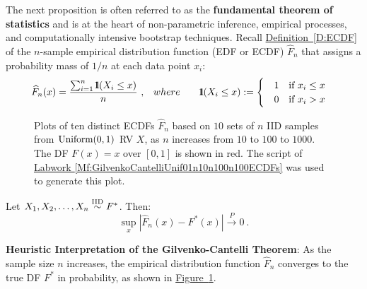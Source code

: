 The next proposition is often referred to as the {\bf fundamental theorem of statistics} and is at the heart of non-parametric inference, empirical processes, and computationally intensive bootstrap techniques.  Recall  \hyperref[D:ECDF]{Definition~\ref*{D:ECDF}} of the $n$-sample empirical distribution function (EDF or ECDF) $\widehat{F}_n$ that assigns a probability mass of $1/n$ at each data point $x_i$:
\begin{eqnarray*} %
\widehat{F}_n(x) = \frac{ \sum_{i=1}^n \BB{1}(X_i \leq x) }{n} \ ,  & \quad where \qquad
\BB{1}(X_i \leq x) :=
\begin{cases}
& 1  \quad \text{if $x_i \leq x$} \\
& 0  \quad \text{if $x_i > x$} 
\end{cases}
\end{eqnarray*}

\begin{figure}[htpb]
\caption{Plots of ten distinct ECDFs $\widehat{F}_n$ based on $10$ sets of $n$ IID samples from $\mbox{{\rm Uniform}}(0,1)$ RV $X$, as $n$ increases from $10$ to $100$ to $1000$.  The DF $F(x)=x$ over $[0,1]$ is shown in red.  The script of \hyperref[Mf:GilvenkoCantelliUnif01n10n100n100ECDFs]{Labwork \ref*{Mf:GilvenkoCantelliUnif01n10n100n100ECDFs}} was used to generate this plot.   \label{F:GilvenkoCantelliUnif01n10n100n100ECDFs}}
\centering   {}
\end{figure}
\begin{prop}\label{P:Gilvenko-Cantelli}
Let $X_1,X_2,\ldots,X_n \overset{{\rm IID}}{\sim} F^*$.  Then:
\[
\sup_x { | \widehat{F}_n(x) - F^*(x) | } \overset{P}{\longrightarrow} 0 \ .
\]
\end{prop}
{\bf Heuristic Interpretation of the Gilvenko-Cantelli Theorem}:  As the sample size $n$ increases, the empirical distribution function $\widehat{F}_n$ converges to the true DF $F^*$ in probability, as shown in \hyperref[F:GilvenkoCantelliUnif01n10n100n100ECDFs]{Figure~\ref*{F:GilvenkoCantelliUnif01n10n100n100ECDFs}}.

